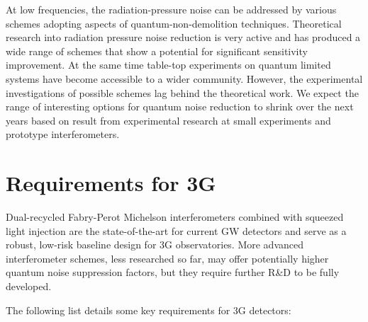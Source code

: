 At low frequencies, the radiation-pressure noise can be addressed by various schemes adopting aspects of quantum-non-demolition techniques. Theoretical research into radiation pressure noise reduction is very active and has produced a wide range of schemes that show a potential for significant sensitivity improvement. At the same time table-top experiments on quantum limited systems have become accessible to a wider community. However, the experimental investigations of possible schemes lag behind the theoretical work. We expect the range of interesting options for quantum noise reduction to shrink over the next years based on result from experimental research at small experiments and prototype interferometers.

\section{Requirements for 3G}
Dual-recycled Fabry-Perot Michelson interferometers combined with squeezed light injection are the state-of-the-art for current GW detectors and serve as a robust, low-risk baseline design for 3G observatories.  More advanced interferometer schemes, less researched so far, may offer potentially higher quantum noise suppression factors, but they require further R\&D to be fully developed. 

The following list details some key requirements for 3G detectors:

